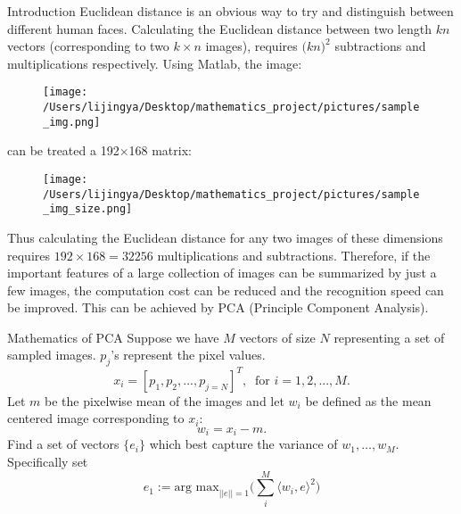 \documentclass[final]{beamer}
\newlength{\onecolwid}
\begin{document}
\begin{frame}[t]
\begin{columns}[t]
\begin{column}{\onecolwid}
\begin{block}{Introduction}
Euclidean distance is an obvious way to try and distinguish between different human faces. Calculating the Euclidean distance between two length $kn$ vectors (corresponding to two $k \times n$ images), requires $\Big(kn\Big)^2$ subtractions and multiplications respectively. Using Matlab, the image:
\begin{figure}[h]
\centering
\texttt{[image: /Users/lijingya/Desktop/mathematics\_project/pictures/sample\_img.png]}
\end{figure}
can be treated a 192$\times$168 matrix:\\
\begin{figure}[h]
\centering
\texttt{[image: /Users/lijingya/Desktop/mathematics\_project/pictures/sample\_img\_size.png]}
\end{figure}
Thus calculating the Euclidean distance for any two images of these dimensions requires $192\times168=32256$ multiplications and subtractions. Therefore, if the important features of a large collection of images can be summarized by just a few images, the computation cost can be reduced and the recognition speed can be improved. This can be achieved by PCA (Principle Component Analysis).
\end{block}

\vspace{-5mm}


\begin{block}{Mathematics of PCA}
Suppose we have $M$ vectors of size $N$ representing a set of sampled images. $p_j$'s represent the pixel values.
\begin{equation*}
x_i = [p_1,p_2,...,p_{j=N}]^T, \;\; \text{for } i=1,2,...,M.
\end{equation*}
Let $m$ be the pixelwise mean of the images
and let $w_i$ be defined as the mean centered image corresponding to $x_i$:
\begin{equation*}
w_i = x_i - m.
\end{equation*}
Find a set of vectors $\Big\{e_i\Big\}$ which best capture the variance of $w_1, \dots, w_M$. Specifically set
\begin{equation*}
e_1 := \text{arg max}_{||e||=1} \Big(\sum_{i}^M \Big\langle w_i, e\Big\rangle^2 \Big)
\end{equation*}
\end{block}


\end{column}
\end{columns}
\end{frame}
\end{document}
